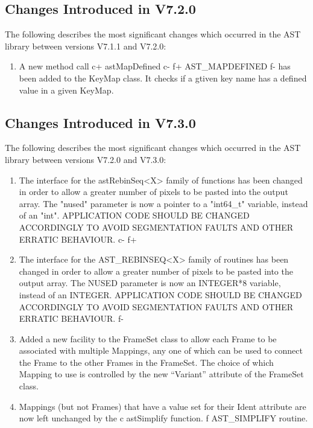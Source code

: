 \documentclass[twoside,11pt]{starlink}
\begin{document}
\subsection{Changes Introduced in V7.2.0}

The following describes the most significant changes which
occurred in the AST library between versions V7.1.1 and V7.2.0:

\begin{enumerate}

\item A new method call
c+
astMapDefined
c-
f+
AST\_MAPDEFINED
f-
has been added to the KeyMap class. It checks if a gtiven key name has
a defined value in a given KeyMap.

\end{enumerate}

\subsection{Changes Introduced in V7.3.0}

The following describes the most significant changes which
occurred in the AST library between versions V7.2.0 and V7.3.0:

\begin{enumerate}

c+
\item The interface for the astRebinSeq<X> family of functions has
been changed in order to allow a greater number of pixels to be pasted
into the output array. The "nused" parameter is now a pointer to a
"int64\_t" variable, instead of an "int". APPLICATION CODE SHOULD BE
CHANGED ACCORDINGLY TO AVOID SEGMENTATION FAULTS AND OTHER ERRATIC
BEHAVIOUR.
c-
f+
\item The interface for the AST\_REBINSEQ<X> family of routines has
been changed in order to allow a greater number of pixels to be pasted
into the output array. The NUSED parameter is now an INTEGER*8 variable,
instead of an INTEGER. APPLICATION CODE SHOULD BE CHANGED ACCORDINGLY TO
AVOID SEGMENTATION FAULTS AND OTHER ERRATIC BEHAVIOUR.
f-

\item Added a new facility to the FrameSet class to allow each Frame to be
associated with multiple Mappings, any one of which can be used to
connect the Frame to the other Frames in the FrameSet. The choice of
which Mapping to use is controlled by the new ``Variant'' attribute of the
FrameSet class.

\item Mappings (but not Frames) that have a value set for their Ident
attribute are now left unchanged by the
c astSimplify function.
f AST\_SIMPLIFY routine.

\end{enumerate}
\end{document}
